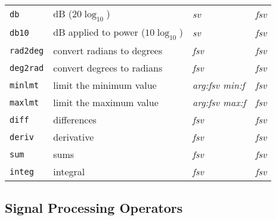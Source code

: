 \begin{tabular}{p{.8in}p{2.5in}p{1.0in}p{.75in}}
{\tt db} & dB ($20 \log_{10}$) & {\it sv} & {\it fsv} \\
{\tt db10} & dB applied to power ($10 \log_{10}$) & {\it sv}
  & {\it fsv} \\
{\tt rad2deg} & convert radians to degrees & {\it fsv} & {\it fsv} \\
{\tt deg2rad} & convert degrees to radians & {\it fsv} & {\it fsv} \\
{\tt minlmt} & limit the minimum value & {\it arg:fsv \newline min:f} &           {\it fsv} \\
{\tt maxlmt} & limit the maximum value & {\it arg:fsv \newline
max:f} &
  {\it fsv} \\
{\tt diff} & differences & {\it fsv} & {\it fsv} \\
{\tt deriv} & derivative & {\it fsv} & {\it fsv} \\
{\tt sum} & sums & {\it fsv} & {\it fsv} \\
{\tt integ} & integral & {\it fsv} & {\it fsv}
\end{tabular}

\newpage
\subsection*{Signal Processing Operators}

